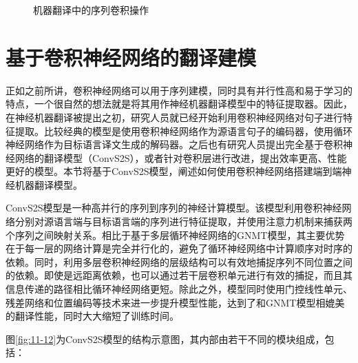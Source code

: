 \begin{figure}[htp]
\centering
%

\caption{机器翻译中的序列卷积操作}
\label{fig:11-11}
\end{figure}

\section{基于卷积神经网络的翻译建模}

\parinterval 正如之前所讲，卷积神经网络可以用于序列建模，同时具有并行性高和易于学习的特点，一个很自然的想法就是将其用作神经机器翻译模型中的特征提取器。因此，在神经机器翻译被提出之初，研究人员就已经开始利用卷积神经网络对句子进行特征提取。比较经典的模型是使用卷积神经网络作为源语言句子的编码器，使用循环神经网络作为目标语言译文生成的解码器。之后也有研究人员提出完全基于卷积神经网络的翻译模型（ConvS2S），或者针对卷积层进行改进，提出效率更高、性能更好的模型。本节将基于ConvS2S模型，阐述如何使用卷积神经网络搭建端到端神经机器翻译模型。

\parinterval ConvS2S模型是一种高并行的序列到序列的神经计算模型。该模型利用卷积神经网络分别对源语言端与目标语言端的序列进行特征提取，并使用注意力机制来捕获两个序列之间映射关系。相比于基于多层循环神经网络的GNMT模型，其主要优势在于每一层的网络计算是完全并行化的，避免了循环神经网络中计算顺序对时序的依赖。同时，利用多层卷积神经网络的层级结构可以有效地捕捉序列不同位置之间的依赖。即使是远距离依赖，也可以通过若干层卷积单元进行有效的捕捉，而且其信息传递的路径相比循环神经网络更短。除此之外，模型同时使用门控线性单元、残差网络和位置编码等技术来进一步提升模型性能，达到了和GNMT模型相媲美的翻译性能，同时大大缩短了训练时间。

\parinterval 图\ref{fig:11-12}为ConvS2S模型的结构示意图，其内部由若干不同的模块组成，包括：

